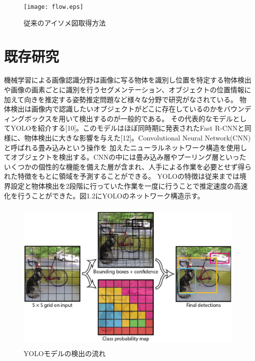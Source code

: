 \begin{figure}[htbt]
	\centering
	 \texttt{[image: flow.eps]}
	 \caption{従来のアイソメ図取得方法}
	 \label{fig:f2}
\end{figure}

\section{既存研究}
機械学習による画像認識分野は画像に写る物体を識別し位置を特定する物体検出や画像の画素ごとに識別を行うセグメンテーション、オブジェクトの位置情報に加えて向きを推定する姿勢推定問題など様々な分野で研究がなされている。
物体検出は画像内で認識したいオブジェクトがどこに存在しているのかをバウンディングボックスを用いて検出するのが一般的である。
その代表的なモデルとしてYOLOを紹介する[10]。このモデルはほぼ同時期に発表されたFast R-CNNと同様に、物体検出に大きな影響を与えた[12]。Convolutional Neural Network(CNN)と呼ばれる畳み込みという操作を
加えたニューラルネットワーク構造を使用してオブジェクトを検出する。CNNの中には畳み込み層やプーリング層といったいくつかの個性的な機能を備えた層が含まれ、人手による作業を必要とせず得られた特徴をもとに領域を予測することができる。
YOLOの特徴は従来までは境界設定と物体検出を2段階に行っていた作業を一度に行うことで推定速度の高速化を行うことができた。図1.2にYOLOのネットワーク構造示す。\\
\begin{figure}[htbt]
	\centering
	 \includegraphics[height=75mm]{yolo.eps}
	 \caption{YOLOモデルの検出の流れ}
	 \label{fig:f2}
\end{figure}

